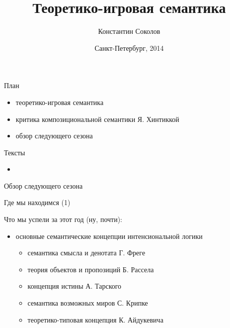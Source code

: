 \documentclass{beamer}
\begin{document}
\title{\Large{Теоретико-игровая семантика}}
\author{Константин Соколов}
\date{Санкт-Петербург, 2014} 
\begin{frame}
    \thispagestyle{empty}
    \titlepage
\end{frame}

\begin{frame}{План}
\setcounter{framenumber}{1}
    \begin{itemize}
		\item теоретико-игровая семантика
		\item критика композициональной семантики Я. Хинтиккой
		\item обзор следующего сезона
    \end{itemize}
\end{frame}

\begin{frame}{Тексты}
\begin{itemize}
	\item 
\end{itemize}
\end{frame}



\begin{frame}{}
\begin{center}
Обзор следующего сезона
\end{center}
\end{frame}

\begin{frame}{Где мы находимся (1)}
\begin{small}
Что мы успели за этот год (ну, почти):\\
\medskip
\begin{itemize}
    \item основные семантические концепции интенсиональной логики
    \begin{itemize}
        \item семантика смысла и денотата Г. Фреге
        \item теория объектов и пропозиций Б. Рассела
        \item концепция истины А. Тарского
        \item семантика возможных миров С. Крипке
        \item теоретико-типовая концепция К. Айдукевича    
    \end{itemize}
\end{itemize}
\end{small}
\end{frame}
\end{document}
